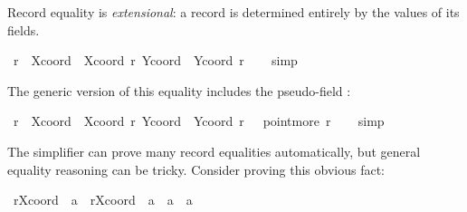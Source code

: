 \begin{isabellebody}
\begin{isamarkuptext}
  Record equality is \emph{extensional}:
   a record is determined entirely
  by the values of its fields.%
\end{isamarkuptext}%
\isamarkuptrue%
\isamarkupfalse%
\ {}r\ {}\ {}Xcoord\ {}\ Xcoord\ r{}\ Ycoord\ {}\ Ycoord\ r{}{}\isanewline
%
\isadelimproof
\ \ %
\endisadelimproof
%
\isatagproof
{}\isamarkupfalse%
\ simp%
\endisatagproof
{\isafoldproof}%
%
\isadelimproof
%
\endisadelimproof
%
\begin{isamarkuptext}%
\noindent
  The generic version of this equality includes the pseudo-field
  :%
\end{isamarkuptext}%
\isamarkuptrue%
\isamarkupfalse%
\ {}r\ {}\ {}Xcoord\ {}\ Xcoord\ r{}\ Ycoord\ {}\ Ycoord\ r{}\ {}\ {}\ point{}more\ r{}{}\isanewline
%
\isadelimproof
\ \ %
\endisadelimproof
%
\isatagproof
{}\isamarkupfalse%
\ simp%
\endisatagproof
{\isafoldproof}%
%
\isadelimproof
%
\endisadelimproof
%
\begin{isamarkuptext}%
The simplifier can prove many record equalities
  automatically, but general equality reasoning can be tricky.
  Consider proving this obvious fact:%
\end{isamarkuptext}%
\isamarkuptrue%
\isamarkupfalse%
\ {}r{}Xcoord\ {}{}\ a{}\ {}\ r{}Xcoord\ {}{}\ a{}{}\ {}\ a\ {}\ a{}{}\isanewline

\end{isabellebody}
